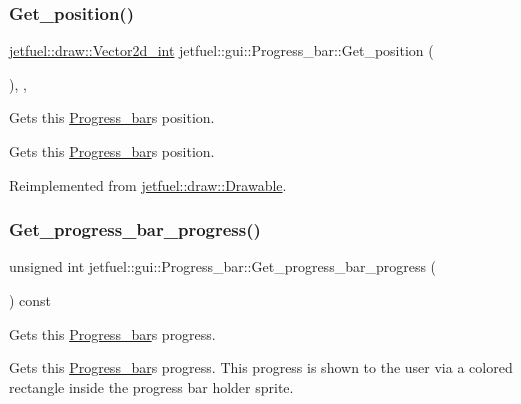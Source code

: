 \subsubsection{\texorpdfstring{Get\+\_\+position()}{Get\_position()}}
{\footnotesize\ttfamily \hyperlink{classjetfuel_1_1draw_1_1Vector2d}{jetfuel\+::draw\+::\+Vector2d\+\_\+int} jetfuel\+::gui\+::\+Progress\+\_\+bar\+::\+Get\+\_\+position (\begin{DoxyParamCaption}{ }\end{DoxyParamCaption})\hspace{0.3cm}{\ttfamily [inline]}, {\ttfamily [override]}, {\ttfamily [virtual]}}



Gets this \hyperlink{classjetfuel_1_1gui_1_1Progress__bar}{Progress\+\_\+bar}\textquotesingle{}s position. 

Gets this \hyperlink{classjetfuel_1_1gui_1_1Progress__bar}{Progress\+\_\+bar}\textquotesingle{}s position. 

Reimplemented from \hyperlink{classjetfuel_1_1draw_1_1Drawable_ae7ebd30d66db2c8a5d5371cbcf0023fc}{jetfuel\+::draw\+::\+Drawable}.

\mbox{\label{classjetfuel_1_1gui_1_1Progress__bar_ae1fc30f6eacefc0fcca909d7d3f52225}} 
\subsubsection{\texorpdfstring{Get\+\_\+progress\+\_\+bar\+\_\+progress()}{Get\_progress\_bar\_progress()}}
{\footnotesize\ttfamily unsigned int jetfuel\+::gui\+::\+Progress\+\_\+bar\+::\+Get\+\_\+progress\+\_\+bar\+\_\+progress (\begin{DoxyParamCaption}{ }\end{DoxyParamCaption}) const\hspace{0.3cm}{\ttfamily [inline]}}



Gets this \hyperlink{classjetfuel_1_1gui_1_1Progress__bar}{Progress\+\_\+bar}\textquotesingle{}s progress. 

Gets this \hyperlink{classjetfuel_1_1gui_1_1Progress__bar}{Progress\+\_\+bar}\textquotesingle{}s progress. This progress is shown to the user via a colored rectangle inside the progress bar holder sprite. \mbox{\label{classjetfuel_1_1gui_1_1Progress__bar_a4a09c3d515c9754b8295a4b5d83291ff}} 
